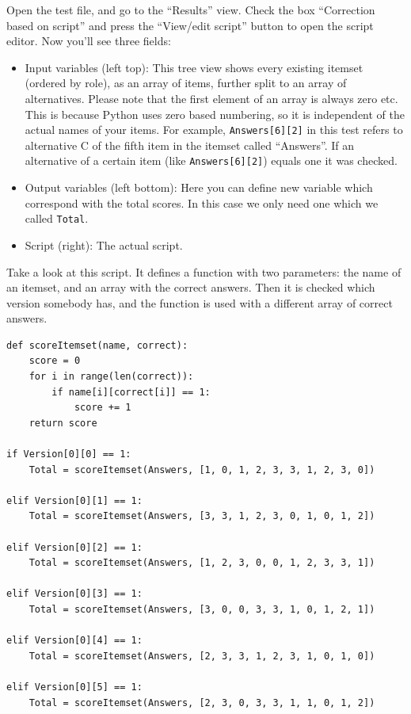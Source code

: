 \documentclass[10pt,a4paper]{article}
\begin{document}
Open the test file, and go to the ``Results'' view. Check the box ``Correction based on script'' and press the ``View/edit script'' button to open the script editor. Now you'll see three fields:
\begin{itemize}
\item Input variables (left top): This tree view shows every existing itemset (ordered by role), as an array of items, further split to an array of alternatives. Please note that the first element of an array is always zero etc. This is because Python uses zero based numbering, so it is independent of the actual names of your items. For example, {\tt Answers[6][2]} in this test refers to alternative C of the fifth item in the itemset called ``Answers''. If an alternative of a certain item (like {\tt Answers[6][2]}) equals one it was checked.
\item Output variables (left bottom): Here you can define new variable which correspond with the total scores. In this case we only need one which we called {\tt Total}.
\item Script (right): The actual script. 
\end{itemize}

Take a look at this script. It defines a function with two parameters: the name of an itemset, and an array with the correct answers. Then it is checked which version somebody has, and the function is used with a different array of correct answers.

\begin{verbatim}
def scoreItemset(name, correct):
    score = 0
    for i in range(len(correct)):
        if name[i][correct[i]] == 1:
            score += 1
    return score

if Version[0][0] == 1:
    Total = scoreItemset(Answers, [1, 0, 1, 2, 3, 3, 1, 2, 3, 0])
        
elif Version[0][1] == 1:
    Total = scoreItemset(Answers, [3, 3, 1, 2, 3, 0, 1, 0, 1, 2])

elif Version[0][2] == 1:
    Total = scoreItemset(Answers, [1, 2, 3, 0, 0, 1, 2, 3, 3, 1])
    
elif Version[0][3] == 1: 
    Total = scoreItemset(Answers, [3, 0, 0, 3, 3, 1, 0, 1, 2, 1])

elif Version[0][4] == 1:
    Total = scoreItemset(Answers, [2, 3, 3, 1, 2, 3, 1, 0, 1, 0])

elif Version[0][5] == 1:
    Total = scoreItemset(Answers, [2, 3, 0, 3, 3, 1, 1, 0, 1, 2])
\end{verbatim}
\end{document}
